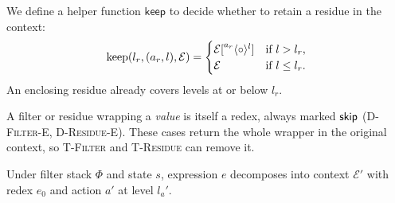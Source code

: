 We define a helper function \(\mathsf{keep}\) to decide whether
to retain a residue in the context:
\[
  \operatorname{keep}(l_r,(a_r,l),\mathcal{E}) =
  \begin{cases}
    \mathcal{E}[\prescript{a_r}{}{\langle} \circ \rangle^{l}]
      & \text{if } l>l_r,\\
    \mathcal{E} & \text{if } l\leq l_r.
  \end{cases}
\]
An enclosing residue already covers levels at or below \(l_r\).

A filter or residue wrapping a \emph{value} is itself a redex,
always marked \(\mathsf{skip}\) (\textsc{D-Filter-E},
\textsc{D-Residue-E}). These cases return the whole wrapper in the
original context, so \textsc{T-Filter} and \textsc{T-Residue} can
remove it.

Under filter stack \(\Phi\) and state \(s\), expression \(e\)
decomposes into context \(\mathcal{E}'\) with redex \(e_0\) and
action \(a'\) at level \(l_a'\).

